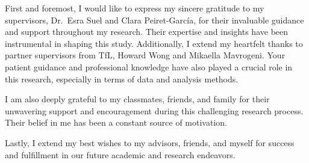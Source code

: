 \begin{acknowledgements}
First and foremost, I would like to express my sincere gratitude to my supervisors, Dr.\ Esra Suel and Clara Peiret-García, for their invaluable guidance and support throughout my research. Their expertise and insights have been instrumental in shaping this study. Additionally, I extend my heartfelt thanks to partner supervisors from TfL, Howard Wong and Mikaella Mavrogeni. Your patient guidance and professional knowledge have also played a crucial role in this research, especially in terms of data and analysis methods.

I am also deeply grateful to my classmates, friends, and family for their unwavering support and encouragement during this challenging research process. Their belief in me has been a constant source of motivation.

Lastly, I extend my best wishes to my advisors, friends, and myself for success and fulfillment in our future academic and research endeavors.
\end{acknowledgements}
